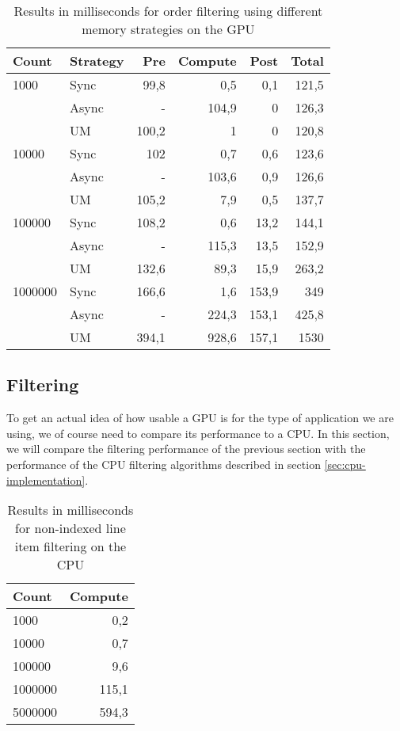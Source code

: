 \documentclass[a4paper,titlepage]{article}
\begin{document}
\begin{table}
\begin{tabular}{l l r r r r}
\toprule
\textbf{Count} & \textbf{Strategy} &\textbf{Pre} & \textbf{Compute} & \textbf{Post} & \textbf{Total}\\
\midrule
1000    & Sync  &  99,8  & 0,5   & 0,1   & 121,5 \\
        & Async &  -     & 104,9 & 0     & 126,3 \\
        & UM    &  100,2 & 1     & 0     & 120,8 \\
10000   & Sync  &  102   & 0,7   & 0,6   & 123,6 \\
        & Async &  -     & 103,6 & 0,9   & 126,6 \\
        & UM    &  105,2 & 7,9   & 0,5   & 137,7 \\
100000  & Sync  &  108,2 & 0,6   & 13,2  & 144,1 \\
        & Async &  -     & 115,3 & 13,5  & 152,9 \\
        & UM    &  132,6 & 89,3  & 15,9  & 263,2 \\
1000000 & Sync  &  166,6 & 1,6   & 153,9 & 349 \\
        & Async &  -     & 224,3 & 153,1 & 425,8 \\
        & UM    &  394,1 & 928,6 & 157,1 & 1530 \\
\bottomrule
\end{tabular}
\caption{Results in milliseconds for order filtering using different memory strategies on the GPU}
\label{tbl:order-strategies}
\end{table}

\subsection{Filtering}
To get an actual idea of how usable a GPU is for the type of application we are using, we of course need to compare its performance to a CPU. In this section, we will compare the filtering performance of the previous section with the performance of the CPU filtering algorithms described in section \ref{sec:cpu-implementation}.

\begin{table}
\begin{tabular}{l r}
\toprule
\textbf{Count} & \textbf{Compute}\\
\midrule
1000    & 0,2 \\
10000   & 0,7 \\
100000  & 9,6 \\
1000000 & 115,1 \\
5000000 & 594,3 \\
\bottomrule
\end{tabular}
\caption{Results in milliseconds for non-indexed line item filtering on the CPU}
\label{tbl:line-items-cpu}
\end{table}
\end{document}
